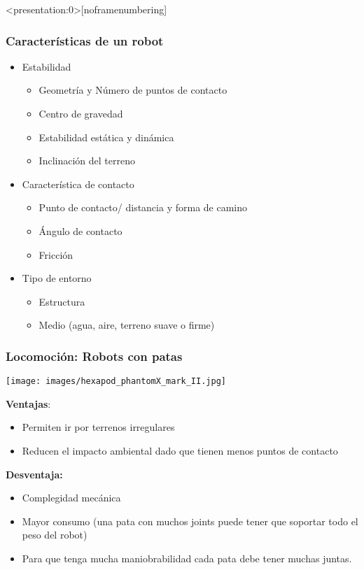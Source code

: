\begin{frame}<presentation:0>[noframenumbering]
	\frametitle{Características de un robot}
	
	\begin{itemize}
		\item Estabilidad
		\begin{itemize}
			\item Geometría y Número de puntos de contacto
			\item Centro de gravedad
			\item Estabilidad estática y dinámica
			\item Inclinación del terreno
		\end{itemize}
		\item Característica de contacto
		\begin{itemize}
			\item Punto de contacto/ distancia y forma de camino
			\item Ángulo de contacto
			\item Fricción
		\end{itemize}
		\item Tipo de entorno
		\begin{itemize}
			\item Estructura
			\item Medio (agua, aire, terreno suave o firme)
		\end{itemize}
	\end{itemize}
\end{frame}


\begin{frame}
    \frametitle{Locomoción: Robots con patas}

    \begin{center}
        \texttt{[image: images/hexapod\_phantomX\_mark\_II.jpg]}
    \end{center}
    \footnotesize
    {\bf Ventajas}:
    \begin{itemize}
        \item Permiten ir por terrenos irregulares
        \item Reducen el impacto ambiental dado que tienen menos puntos de contacto
    \end{itemize}
    {\bf Desventaja: }
    \begin{itemize}
        \item Complegidad mecánica
        \item Mayor consumo (una pata con muchos joints puede tener que soportar todo el peso del robot)
        \item Para que tenga mucha maniobrabilidad cada pata debe tener muchas juntas.
\end{itemize}

\end{frame}


